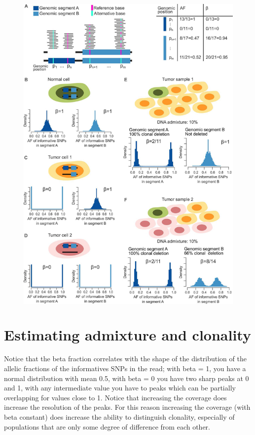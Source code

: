   \begin{figure}[H]
  \includegraphics{image_01.jpg}
  \end{figure}


\section{Estimating admixture and clonality}
  Notice that the beta fraction correlates with the shape of the distribution of the allelic fractions of the informatives SNPs in the read; with beta = 1, you have a normal distribution with mean 0.5, with beta = 0 you have two sharp peaks at 0 and 1, with any intermediate value you have to peaks which can be partially overlapping for values close to 1. Notice that increasing the coverage does increase the resolution of the peaks.
  For this reason increasing the coverage (with beta constant) does increase the ability to distinguish clonality, especially of populations that are only some degree of difference from each other.
  
